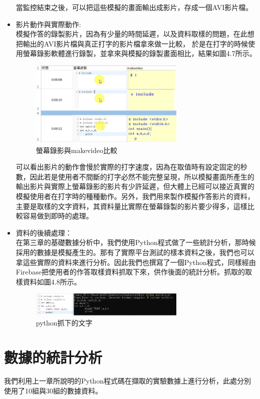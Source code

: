 \begin{itemize}
	當監控結束之後，可以把這些模擬的畫面輸出成影片，存成一個AVI影片檔。
	
	\item 影片動作與實際動作:\\
	模擬作答的錄製影片，因為有少量的時間延遲，以及資料取樣的問題，在此想把輸出的AVI影片檔與真正打字的影片檔拿來做一比較，
	於是在打字的時候使用螢幕錄影軟體進行錄製，並拿來與模擬的錄製畫面相比，結果如圖4.7所示。\\
			\begin{figure}[H] 
		\centering 
		\includegraphics[width=0.7\textwidth]{diff.png}
		\caption{螢幕錄影與makevideo比較} 
		\label{Fig.4.4.3} 
		\end{figure}
	可以看出影片的動作會慢於實際的打字速度，因為在取值時有設定固定的秒數，因此若是使用者不間斷的打字必然不能完整呈現，所以模擬畫面所產生的輸出影片與實際上螢幕錄影的影片有少許延遲，但大體上已經可以接近真實的模擬使用者在打字時的種種動作。另外，我們用來製作模擬作答影片的資料，主要是取樣的文字資料，其資料量比實際在螢幕錄製的影片要少得多，這樣比較容易做到即時的處理。

	\item 資料的後續處理：\\
	在第三章的基礎數據分析中，我們使用Python程式做了一些統計分析，那時候採用的數據是模擬產生的。那有了實際平台測試的樣本資料之後，我們也可以拿這些實際的資料來進行分析。因此我們也撰寫了一個Python程式，同樣經由Firebase把使用者的作答取樣資料抓取下來，供作後面的統計分析。抓取的取樣資料如圖4.8所示。
	\begin{figure}[H] 
		\centering 
		\includegraphics[width=0.7\textwidth]{anysis.png}
		\caption{python抓下的文字} 
		\label{Fig.4.4.4} 
	\end{figure}
\end{itemize}

\section{數據的統計分析}
\vspace*{-4mm}
我們利用上一章所說明的Python程式碼在擷取的實驗數據上進行分析，此處分別使用了10組與30組的數據資料。
